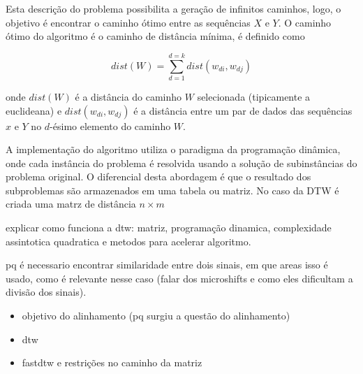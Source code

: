 Esta descrição do problema possibilita a geração de infinitos caminhos, logo, o objetivo é encontrar o caminho ótimo entre as sequências $X$ e $Y$. O caminho ótimo do algoritmo é o caminho de distância mínima, é definido como

\begin{equation*}
    dist(W) = \sum_{d=1}^{d=k} dist(w_{di}, w_{dj})
\end{equation*}

onde $dist(W)$ é a distância do caminho $W$ selecionada (tipicamente a euclideana) e $dist(w_{di}, w_{dj})$ é a distância entre um par de dados das sequências $x$ e $Y$ no $d$-ésimo elemento do caminho $W$.

A implementação do algoritmo utiliza o paradigma da programação dinâmica, onde cada instância do problema é resolvida usando a solução de subinstâncias do problema original. O diferencial desta abordagem é que o resultado dos subproblemas são armazenados em uma tabela ou matriz. No caso da DTW é criada uma matrz de distância $n \times m$ 




explicar como funciona a dtw: matriz, programação dinamica, complexidade assintotica quadratica e metodos para acelerar algoritmo.


pq é necessario encontrar similaridade entre dois sinais, em que areas isso é usado, como é relevante nesse caso (falar dos microshifts e como eles dificultam a divisão dos sinais).

\begin{itemize}
    \item objetivo do alinhamento (pq surgiu a questão do alinhamento) 
    \item dtw
    \item fastdtw e restrições no caminho da matriz
\end{itemize}


